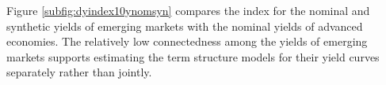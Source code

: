\begin{appendices}
Figure \ref{subfig:dyindex10ynomsyn} compares the index for the nominal and synthetic yields of emerging markets with the nominal yields of advanced economies. %
The relatively low connectedness among the yields of emerging markets %
supports estimating the term structure models for their yield curves separately rather than jointly.

\end{appendices}
